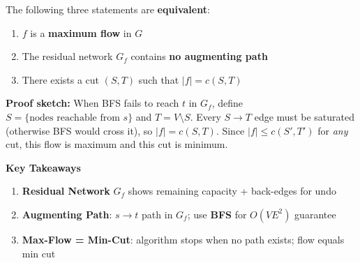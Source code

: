 \documentclass[10pt,a4paper]{article}
\newcommand{\Gf}{G_f}
\begin{document}
\vspace{6pt}

\begin{thmbox}
The following three statements are \textbf{equivalent}:
\begin{enumerate}
  \item $f$ is a \textbf{maximum flow} in $G$
  \item The residual network $\Gf$ contains \textbf{no augmenting path}
  \item There exists a cut $(S,T)$ such that $|f| = c(S,T)$
\end{enumerate}
\end{thmbox}

\vspace{4pt}

\textbf{\color{accent}Proof sketch:}\;
When BFS fails to reach $t$ in $\Gf$, define $S=\{\text{nodes reachable from } s\}$ and $T=V\setminus S$.
Every $S{\to}T$ edge must be saturated (otherwise BFS would cross it), so $|f|=c(S,T)$.
Since $|f|\leq c(S',T')$ for \textit{any} cut, this flow is maximum and this cut is minimum.
\vspace{8pt}
\begin{center}
\colorbox{lightbg}{\parbox{0.9\textwidth}{\centering
\textbf{\large\color{accent} Key Takeaways}\\[4pt]
\begin{minipage}{0.9\textwidth}
\begin{enumerate}
  \item \textbf{\color{sky}Residual Network} $\Gf$ shows remaining capacity + back-edges for undo
  \item \textbf{\color{amber}Augmenting Path}: $s{\to}t$ path in $\Gf$; use \textbf{BFS} for $O(VE^2)$ guarantee
  \item \textbf{\color{rose}Max-Flow = Min-Cut}: algorithm stops when no path exists; flow equals min cut
\end{enumerate}
\end{minipage}}}
\end{center}
\end{document}

